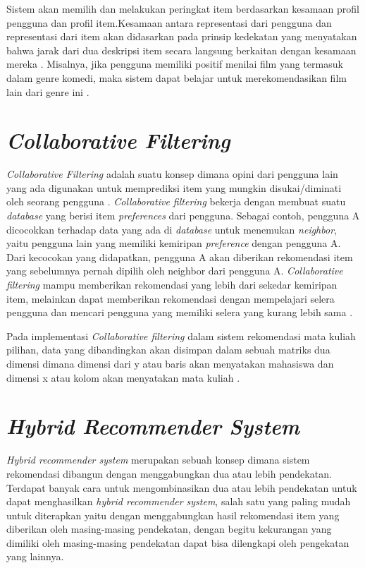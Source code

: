 Sistem akan memilih dan melakukan peringkat item berdasarkan kesamaan profil pengguna dan profil item.Kesamaan antara representasi dari pengguna dan representasi dari
item akan didasarkan pada prinsip kedekatan yang menyatakan bahwa jarak dari dua deskripsi item secara langsung berkaitan dengan kesamaan mereka \citep{rekomendasiTanaman}.
Misalnya, jika pengguna memiliki positif menilai film yang termasuk dalam genre komedi, maka sistem dapat belajar untuk
merekomendasikan film lain dari genre ini \citep{handbook}.


\section{\emph{Collaborative Filtering}}
\emph{Collaborative Filtering} adalah suatu konsep dimana opini dari pengguna lain yang ada digunakan untuk memprediksi item yang mungkin disukai/diminati oleh seorang pengguna \citep{handbook}.
\emph{Collaborative filtering} bekerja dengan membuat suatu \emph{database} yang berisi item \emph{preferences} dari pengguna. Sebagai contoh, pengguna A dicocokkan terhadap data yang ada di \emph{database} untuk menemukan
\emph{neighbor}, yaitu pengguna lain yang memiliki kemiripan \emph{preference} dengan pengguna A. Dari kecocokan yang didapatkan, pengguna A akan diberikan rekomendasi item yang sebelumnya pernah dipilih oleh neighbor dari
pengguna A. \emph{Collaborative filtering} mampu memberikan rekomendasi yang lebih dari sekedar kemiripan item, melainkan dapat memberikan rekomendasi dengan mempelajari selera pengguna dan mencari pengguna yang memiliki selera yang kurang lebih sama \citep{contentBasedXCollaborative}.

Pada implementasi \emph{Collaborative filtering} dalam sistem rekomendasi mata kuliah pilihan, data yang dibandingkan akan disimpan dalam sebuah matriks dua dimensi dimana dimensi dari y atau baris akan menyatakan mahasiswa dan dimensi x atau kolom akan menyatakan mata kuliah
\citep{cosineSimilarity}.

\section{\emph{Hybrid Recommender System}}
\emph{Hybrid recommender system} merupakan sebuah konsep dimana sistem rekomendasi dibangun dengan menggabungkan dua atau lebih pendekatan. Terdapat banyak cara untuk mengombinasikan dua atau lebih pendekatan untuk dapat menghasilkan \emph{hybrid recommender system},
salah satu yang paling mudah untuk diterapkan yaitu dengan menggabungkan hasil rekomendasi item yang diberikan oleh masing-masing pendekatan, dengan begitu kekurangan yang dimiliki oleh masing-masing pendekatan dapat bisa dilengkapi oleh pengekatan yang lainnya.

